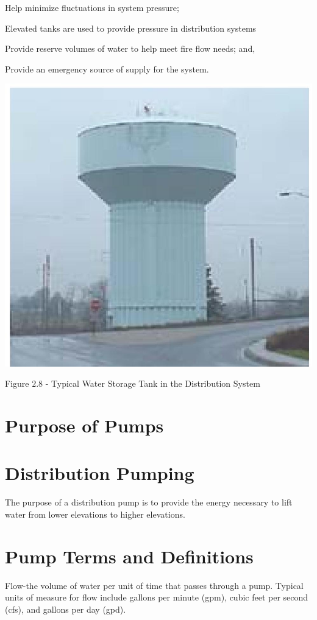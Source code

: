 \documentclass[10pt]{article}
\begin{document}
Help minimize fluctuations in system pressure;

Elevated tanks are used to provide pressure in distribution systems

Provide reserve volumes of water to help meet fire flow needs; and,

Provide an emergency source of supply for the system.

\includegraphics[max width=\textwidth]{2022_10_30_098bb5f44c5986ff92a9g-18}

Figure $2.8$ - Typical Water Storage Tank in the Distribution System

\section{Purpose of Pumps}
\section{Distribution Pumping}
The purpose of a distribution pump is to provide the energy necessary to lift water from lower elevations to higher elevations.

\section{Pump Terms and Definitions}
Flow-the volume of water per unit of time that passes through a pump. Typical units of measure for flow include gallons per minute (gpm), cubic feet per second (cfs), and gallons per day (gpd).
\end{document}
